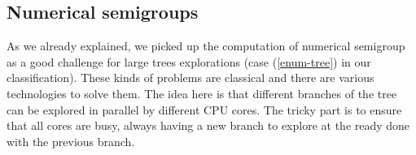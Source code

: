 \documentclass{deliverablereport}
\newcommand{\CilkP}{\texttt{Cilk++}\xspace}
\begin{document}




\subsection{Numerical semigroups}
\label{subsec:numerical-semigroups}

As we already explained, we picked up the computation of numerical semigroup
as a good challenge for large trees explorations (case (\ref{enum-tree}) in our
classification). These kinds of problems are classical and there are various
technologies to solve them. The idea here is that different branches of the
tree can be explored in parallel by different CPU cores. The
tricky part is to ensure that all cores are busy, always having a new branch to
explore at the ready done with the previous branch.
\end{document}

